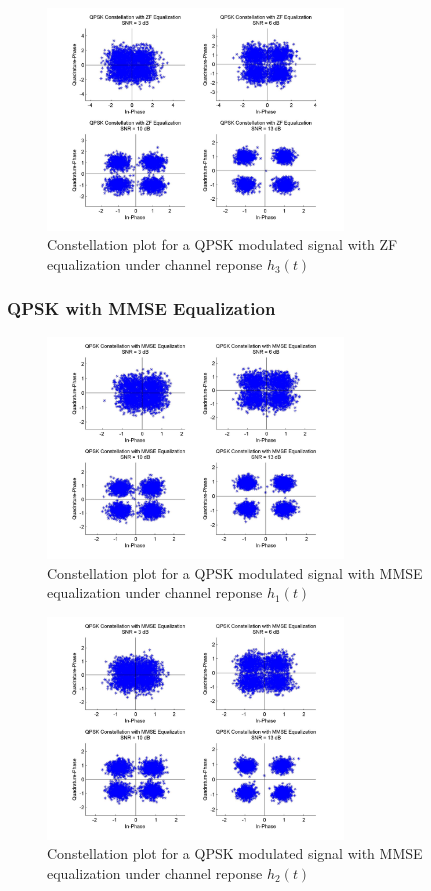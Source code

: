 \documentclass[]{article}
\begin{document}
\begin{figure}[H]
\centering
\includegraphics[width=0.7\textwidth]{qpConstZF3.jpg}
\caption{Constellation plot for a QPSK modulated signal with ZF equalization under channel reponse $h_3(t)$}
\end{figure}

\subsubsection{QPSK with MMSE Equalization}

\begin{figure}[H]
\centering
\includegraphics[width=0.7\textwidth]{qpConstMMSE1.jpg}
\caption{Constellation plot for a QPSK modulated signal with MMSE equalization under channel reponse $h_1(t)$}
\end{figure}

\begin{figure}[H]
\centering
\includegraphics[width=0.7\textwidth]{qpConstMMSE2.jpg}
\caption{Constellation plot for a QPSK modulated signal with MMSE equalization under channel reponse $h_2(t)$}
\end{figure}
\end{document}
